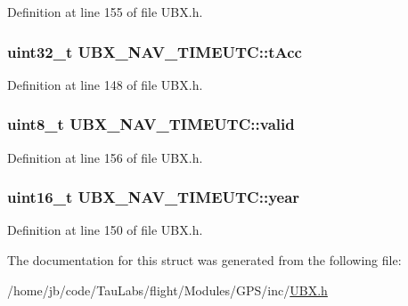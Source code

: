\-Definition at line 155 of file \-U\-B\-X.\-h.

\hypertarget{struct_u_b_x___n_a_v___t_i_m_e_u_t_c_adb8a5ad986f11644415dc969c0803cc9}{
\subsubsection[{t\-Acc}]{\setlength{\rightskip}{0pt plus 5cm}uint32\-\_\-t {\bf \-U\-B\-X\-\_\-\-N\-A\-V\-\_\-\-T\-I\-M\-E\-U\-T\-C\-::t\-Acc}}}\label{struct_u_b_x___n_a_v___t_i_m_e_u_t_c_adb8a5ad986f11644415dc969c0803cc9}


\-Definition at line 148 of file \-U\-B\-X.\-h.

\hypertarget{struct_u_b_x___n_a_v___t_i_m_e_u_t_c_a7709acce4beceb6a24a8f239923fb026}{
\subsubsection[{valid}]{\setlength{\rightskip}{0pt plus 5cm}uint8\-\_\-t {\bf \-U\-B\-X\-\_\-\-N\-A\-V\-\_\-\-T\-I\-M\-E\-U\-T\-C\-::valid}}}\label{struct_u_b_x___n_a_v___t_i_m_e_u_t_c_a7709acce4beceb6a24a8f239923fb026}


\-Definition at line 156 of file \-U\-B\-X.\-h.

\hypertarget{struct_u_b_x___n_a_v___t_i_m_e_u_t_c_a8ea81fa402795b3daf6ec8bcc9c51eb1}{
\subsubsection[{year}]{\setlength{\rightskip}{0pt plus 5cm}uint16\-\_\-t {\bf \-U\-B\-X\-\_\-\-N\-A\-V\-\_\-\-T\-I\-M\-E\-U\-T\-C\-::year}}}\label{struct_u_b_x___n_a_v___t_i_m_e_u_t_c_a8ea81fa402795b3daf6ec8bcc9c51eb1}


\-Definition at line 150 of file \-U\-B\-X.\-h.



\-The documentation for this struct was generated from the following file\-:\begin{DoxyCompactItemize}
\item 
/home/jb/code/\-Tau\-Labs/flight/\-Modules/\-G\-P\-S/inc/\hyperlink{_u_b_x_8h}{\-U\-B\-X.\-h}\end{DoxyCompactItemize}

